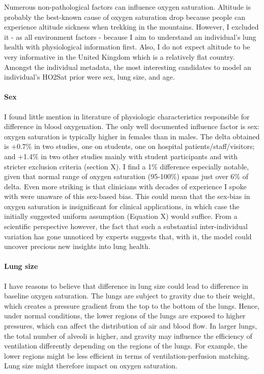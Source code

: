 
Numerous non-pathological factors can influence oxygen saturation. Altitude is probably the best-known cause of oxygen saturation drop because people can experience altitude sickness when trekking in the mountains. However, I excluded it - as all environment factors - because I aim to understand an individual's lung health with physiological information first. Also, I do not expect altitude to be very informative in the United Kingdom which is a relatively flat country. Amongst the individual metadata, the most interesting candidates to model an individual's HO2Sat prior were sex, lung size, and age.

\paragraph{Sex}
I found little mention in literature of physiologic characteristics responsible for difference in blood oxygenation. The only well documented influence factor is sex: oxygen saturation is typically higher in females than in males. The delta obtained is +0.7\% in two studies, one on students, one on hospital patients/staff/visitors; and +1.4\% in two other studies mainly with student participants and with stricter exclusion criteria (section X). I find a 1\% difference especially notable, given that normal range of oxygen saturation (95-100\%) spans just over 6\% of delta. Even more striking is that clinicians with decades of experience I spoke with were unaware of this sex-based bias. This could mean that the sex-bias in oxygen saturation is insignificant for clinical applications, in which case the initially suggested uniform assumption (Equation X) would suffice. From a scientific perspective however, the fact that such a substantial inter-individual variation has gone unnoticed by experts suggests that, with it, the model could uncover precious new insights into lung health.

\paragraph{Lung size}
I have reasons to believe that difference in lung size could lead to difference in baseline oxygen saturation. The lungs are subject to gravity due to their weight, which creates a pressure gradient from the top to the bottom of the lungs. Hence, under normal conditions, the lower regions of the lungs are exposed to higher pressures, which can affect the distribution of air and blood flow. In larger lungs, the total number of alveoli is higher, and gravity may influence the efficiency of ventilation differently depending on the regions of the lungs. For example, the lower regions might be less efficient in terms of ventilation-perfusion matching. Lung size might therefore impact on oxygen saturation.

